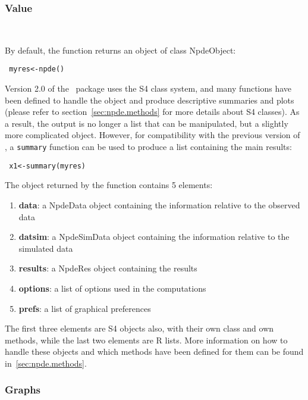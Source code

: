 \subsubsection{Value}~\label{sec:value}

\hskip 18pt By default, the function returns an object of class NpdeObject: \begin{verbatim} myres<-npde() 
\end{verbatim} Version 2.0 of the \npde~package uses the S4 class system, and many functions have been defined to 
handle the object and produce descriptive summaries and plots (please refer to section~\ref{sec:npde.methods} for 
more details about S4 classes). As a result, the output is no longer a list that can be manipulated, but a slightly 
more complicated object. However, for compatibility with the previous version of \npde, a \texttt{summary} function 
can be used to produce a list containing the main results: \begin{verbatim} x1<-summary(myres) \end{verbatim}

\bigskip The object returned by the function contains 5 elements: \begin{enumerate} \item \textbf{data}: a NpdeData 
object containing the information relative to the observed data \item \textbf{datsim}: a NpdeSimData object 
containing the information relative to the simulated data \item \textbf{results}: a NpdeRes object containing the 
results \item \textbf{options}: a list of options used in the computations \item \textbf{prefs}: a list of 
graphical preferences \end{enumerate} The first three elements are S4 objects also, with their own class and own 
methods, while the last two elements are R lists. More information on how to handle these objects and which methods 
have been defined for them can be found in~\ref{sec:npde.methods}.

\subsubsection{Graphs} \label{sec:graphics}

